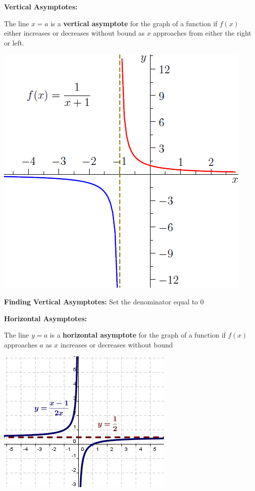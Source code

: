 \documentclass[12pt]{article}
\begin{document}
\textbf{Vertical Asymptotes:} 

The line $x = a$ is a \textbf{vertical asymptote} for the graph of a function if $f(x)$ either increases or decreases without bound as $x$ approaches from either the right or left.  

\centerline{\includegraphics[scale = 0.5]{VerticalAsymptote.png}}

\textbf{Finding Vertical Asymptotes:} Set the denominator equal to $0$

\textbf{Horizontal Asymptotes:} 

The line $y = a$ is a \textbf{horizontal asymptote} for the graph of a function if $f(x)$ approaches $a$ as $x$ increases or decreases without bound

\centerline{\includegraphics[scale = 0.7]{HorizontalAsymptote.png}}
\end{document}
